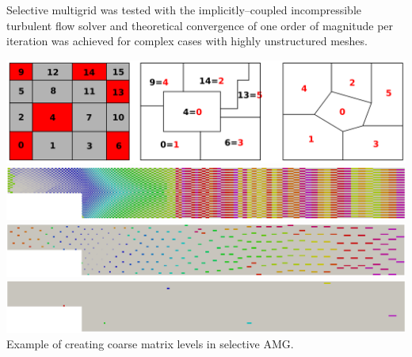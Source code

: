 \documentclass[b1b,portrait]{b0poster}
\begin{document}
\begin{minipage}[t][79cm][t]{0.3\linewidth}
  \large
Selective multigrid was tested with the implicitly--coupled incompressible turbulent flow solver and theoretical convergence of one order of magnitude per iteration was achieved for complex cases with highly unstructured meshes.
\begin{center}
 \includegraphics[keepaspectratio, width=0.99\columnwidth]{figures/polyhedra_SAMG.png}\\
 \includegraphics[keepaspectratio, width=0.99\columnwidth]{figures/time50_coarseningSAMG_level_0.png}\\
  \includegraphics[keepaspectratio, width=0.99\columnwidth]{figures/time50_coarseningSAMG_level_2.png}\\
   \includegraphics[keepaspectratio, width=0.99\columnwidth]{figures/time50_coarseningSAMG_level_5.png}
\small Example of creating coarse matrix levels in selective AMG.
\end{center}


\end{minipage}
\end{document}
